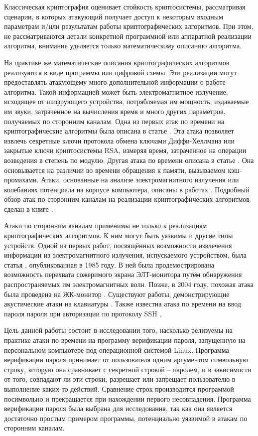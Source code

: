 
Классическая криптография оценивает стойкость криптосистемы, рассматривая
сценарии, в которых атакующий получает доступ к некоторым входным параметрам
и/или результатам работы криптографических алгоритмов. При этом, не
рассматриваются детали конкретной программной или аппаратной реализации
алгоритма, внимание уделяется только математическому описанию алгоритма.

На практике же математические описания криптографических алгоритмов реализуются
в виде программы или цифровой схемы. Эти реализации могут предоставлять
атакующему много дополнительной информации о работе алгоритма. Такой информацией
может быть электромагнитное излучение, исходящее от шифрующего устройства,
потрябляемая им мощность, издаваемые им звуки, затраченное на вычисления время и
много других параметров, получаемых по сторонним каналам. Одна из первых атак по
времени на криптографические алгоритмы была описана в статье \cite{kocher}. Эта
атака позволяет извлечь секретные ключи протокола обмена ключами Диффи-Хеллмана
или закрытые ключи криптосистемы RSA, измеряя время, затраченное на операции
возведения в степень по модулю. Другая атака по времени описана в статье
\cite{bernstein}. Она основывается на различии во времени обращения к памяти,
вызываемом кэш-промахами. Атаки, основанные на анализе электромагнитного
излучения или колебаниях потенциала на корпусе компьютера, описаны в работах
\cite{hands} \cite{em}. Подробный обзор атак по сторонним каналам на реализации
криптографических алгоритмов сделан в книге \cite{cren}.

Атаки по сторонним каналам применимы не только к реализациям криптографических
алгоритмов. К ним могут быть уязвимы и другие типы устройств. Одной из первых
работ, посвящённых возможности извлечения информации из электромагнитного
излучения, испускаемого устройством, была статья \cite{van-eck}, опубликованная
в 1985 году. В ней была продемострирована возможность перехвата сожеримого
экрана ЭЛТ-монитора путём обнаружения распространяемых им электромагнитных волн.
Позже, в 2004 году, похожая атака была проведена на ЖК-монитор \cite{kuhn}.
Существуют работы, демонстрирующие акустические атаки на клавиатуры
\cite{asonov} \cite{zhuang}. Также известна атака по времени на ввод пароля пароля
при авторизации по протоколу SSH \cite{ssh}.

Цель данной работы состоит в исследовании того, насколько релизуемы на практике
атаки по времени на программу верификации пароля, запущенную на персональном
компьютере под операционной системой Linux. Программа верификации пароля
принимает от пользователя одним аргументом символьную строку, которую она
сравнивает с секретной строкой -- паролем, и в зависимости от того, совпадают
ли эти строки, разрешает или запрещает пользователю в выполнение каких-то
действий. Сравнение строк производится программой посимвольно и прекращается
при нахождении первого несовпадения. Программа верификации пароля была выбрана
для исследования, так как она является достаточно простым примером программы,
потенциально уязвимой в атакам по сторонним каналам.

